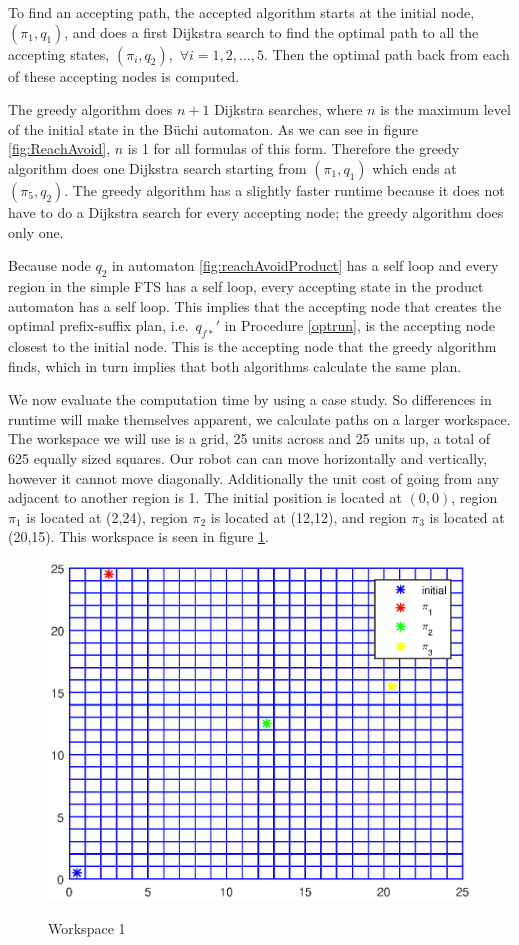 To find an accepting path, the accepted algorithm starts at the initial node, $(\pi_1,q_1)$, and does a first Dijkstra search to find the optimal path to all the accepting states, $(\pi_i,q_2),$ $\forall i = 1,2,\dots,5$. Then the optimal path back from each of these accepting nodes is computed.  
 
The greedy algorithm does $n+1$ Dijkstra searches, where $n$ is the maximum level of the initial state in the B\"{u}chi automaton. As we can see in figure \ref{fig:ReachAvoid}, $n$ is 1 for all formulas of this form. Therefore the greedy algorithm does one Dijkstra search starting from $(\pi_1,q_1)$ which ends at $(\pi_5,q_2)$. The greedy algorithm has a slightly faster runtime because it does not have to do a Dijkstra search for every accepting node; the greedy algorithm does only one. 

Because node $q_2$ in automaton \ref{fig:reachAvoidProduct} has a self loop and every region in the simple FTS has a self loop, every accepting state in the product automaton has a self loop. This implies that the accepting node that creates the optimal prefix-suffix plan, i.e.\ $q_{f*}'$ in Procedure \ref{optrun}, is the accepting node closest to the initial node. This is the accepting node that the greedy algorithm finds, which in turn implies that both algorithms calculate the same plan. 

We now evaluate the computation time by using a case study. So differences in runtime will make themselves apparent, we calculate paths on a larger workspace. The workspace we will use is a grid, 25 units across and 25 units up, a total of 625 equally sized squares. Our robot can can move horizontally and vertically, however it cannot move diagonally. Additionally the unit cost of going from any adjacent to another region is 1. The initial position is located at $(0,0)$, region $\pi_1$ is located at (2,24), region $\pi_2$ is located at (12,12), and region $\pi_3$ is located at (20,15). This workspace is seen in figure \ref{fig:workspace}.

\begin{figure}[!htb]
\centering
\includegraphics[scale=1]{workspace.eps}
\label{fig:workspace}
\caption{Workspace 1}
\end{figure}


